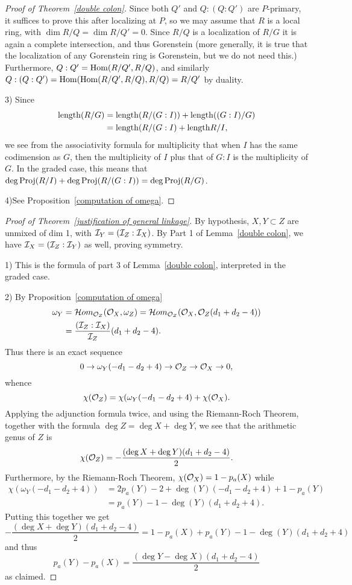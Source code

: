 \begin{proof}[Proof of Theorem~\ref{double colon}]
  Since both $Q'$ and $Q:(Q:Q')$ are $P$-primary, it suffices to prove this after localizing at $P$, so we may assume
  that $R$ is a local ring, with $\dim R/Q = \dim R/Q' = 0$. Since $R/Q$ is a localization of $R/G$ it is again a complete
  intersection, and thus Gorenstein (more generally, it is true that the localization of any Gorenstein ring is Gorenstein, but
  we do not need this.)
  Furthermore, $Q:Q' = \operatorname{Hom}(R/Q', R/Q)$, and similarly $Q:(Q:Q') = \operatorname{Hom}(\operatorname{Hom}(R/Q', R/Q), R/Q) = R/Q'$ by duality.
  
3) Since 
\begin{align*}
 {\rm length} (R/G) &= {\rm length}(R/(G:I))+{\rm length}((G:I)/G)\\
 &= {\rm length}(R/(G:I) +{\rm length} R/I,
\end{align*}
we see from the associativity formula for multiplicity that when $I$ has the same codimension as $G$, then the multiplicity of $I$ plus that of $G:I$ is the multiplicity of $G$. In the graded case, this means that
$\deg \operatorname{Proj}(R/I) +\deg \operatorname{Proj}(R/(G:I)) = \deg \operatorname{Proj}(R/G)$.

4)See Proposition~\ref{computation of omega}.
\end{proof}

 \begin{proof}[Proof of Theorem~\ref{justification of general linkage}]
 By hypothesis, 
$X,Y\subset Z$ are unmixed of dim 1, with ${\mathcal I}_{Y} = ({\mathcal I}_Z:{\mathcal I}_X)$. By Part 1 of Lemma~\ref{double colon}, we have
${\mathcal I}_{X} = ({\mathcal I}_Z:{\mathcal I}_Y)$ as well, proving symmetry.

1) This is  the formula of part 3 of Lemma~\ref{double colon}, interpreted in the graded case.

2)  By Proposition~\ref{computation of omega}
\begin{align*}
 \omega_{Y} &= \mathcal{H}om_{{\mathcal O}_Z}({\mathcal O}_X, \omega_Z) = 
\mathcal{H}om_{{\mathcal O}_Z}({\mathcal O}_X, {\mathcal O}_Z(d_1+d_2-4))\\
&=  \frac{({\mathcal I}_Z:{\mathcal I}_X)}{{\mathcal I}_{Z}}(d_1+d_2-4).
\end{align*}
Thus there is an exact sequence
$$
0\to \omega_{Y}(-d_1-d_2+4) \to {\mathcal O}_Z \to {\mathcal O}_X \to 0,
$$
whence
$$
 \chi({\mathcal O}_Z) =
 \chi(\omega_{Y}(-d_1-d_2+4) +
 \chi({\mathcal O}_X).
 $$
 Applying the adjunction formula twice, and using the Riemann-Roch Theorem, together with the formula
 $\deg Z = \deg X + \deg Y$, we see that the arithmetic genus of $Z$ is
 $$
 \chi({\mathcal O}_Z) = -\frac{(\deg X + \deg Y)(d_1+d_2-4)}{2}.
 $$
Furthermore, by the Riemann-Roch Theorem, $\chi({\mathcal O}_X) = 1-p_a(X)$ while
\begin{align*}
\chi(\omega_{Y}(-d_1-d_2+4)) &= 2p_a(Y) -2 + \deg(Y)(-d_1-d_2+4) + 1- p_a(Y)\\
&= p_a(Y)-1- \deg(Y)(d_1+d_2+4).
\end{align*}
Putting this together we get
$$
-\frac{(\deg X+\deg Y)(d_1+d_2-4)}{2} = 1-p_a(X) + p_a(Y)-1 - \deg(Y)(d_1+d_2+4)
$$
and thus 
$$
p_a(Y) -p_a(X) = \frac{(\deg Y-\deg X)(d_1+d_2-4)}{2}
$$
as claimed.
 \end{proof}


